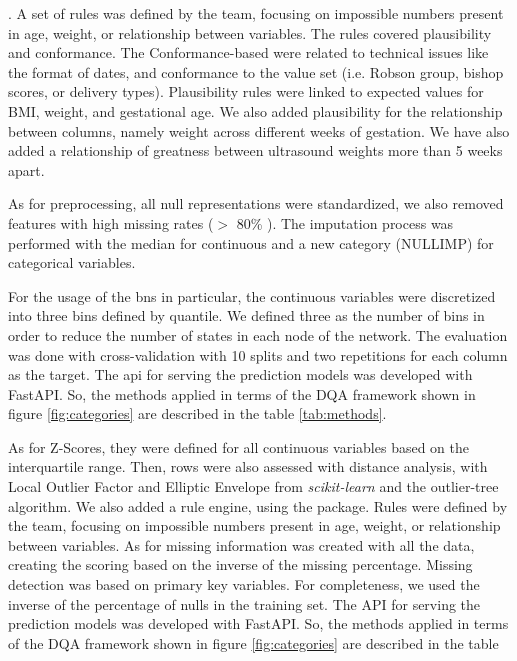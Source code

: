 \cite{GXProactiveCollaborative}. A set of rules was defined by the team, focusing on impossible numbers present in age, weight, or relationship between variables. The rules covered plausibility and conformance. The Conformance-based were related to technical issues like the format of dates, and conformance to the value set (i.e. Robson group, bishop scores, or delivery types). Plausibility rules were linked to expected values for BMI, weight, and gestational age. We also added plausibility for the relationship between columns, namely weight across different weeks of gestation. We have also added a relationship of greatness between ultrasound weights more than 5 weeks apart. 

As for preprocessing, all null representations were standardized, we also removed features with high missing rates ($>$ 80\% ). The imputation process was performed with the median for continuous and a new category (NULLIMP) for categorical variables. 

For the usage of the \acp{bn} in particular, the continuous variables were discretized into three bins defined by quantile. We defined three as the number of bins in order to reduce the number of states in each node of the network. The evaluation was done with cross-validation with 10 splits and two repetitions for each column as the target.
The \ac{api} for serving the prediction models was developed with FastAPI. So, the methods applied in terms of the DQA framework shown in figure \ref{fig:categories} are described in the table \ref{tab:methods}.


As for  Z-Scores, they were defined for all continuous variables based on the interquartile range. Then, rows were also assessed with distance analysis, with Local Outlier Factor and Elliptic Envelope from \textit{scikit-learn} and the outlier-tree algorithm. We also added a rule engine, using the  package. Rules were defined by the team, focusing on impossible numbers present in age, weight, or relationship between variables. As for missing information was created with all the data, creating the scoring based on the inverse of the missing percentage. Missing detection was based on primary key variables. For completeness, we used the inverse of the percentage of nulls in the training set.
The API for serving the prediction models was developed with FastAPI. So, the methods applied in terms of the DQA framework shown in figure \ref{fig:categories} are described in the table 

